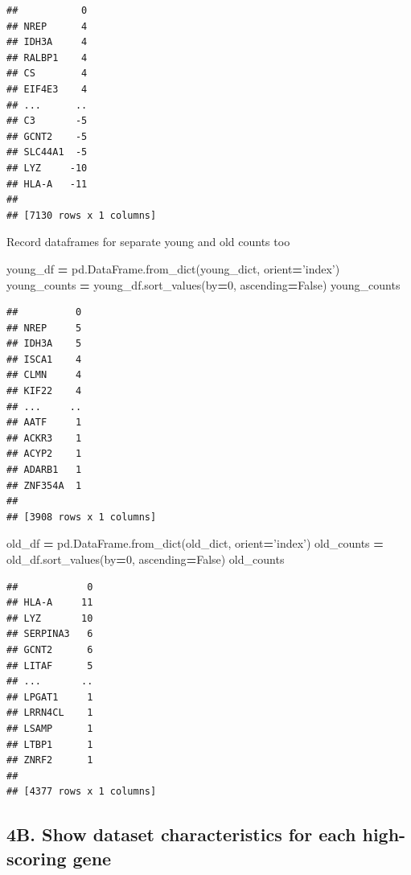 \documentclass[
]{article}
\newenvironment{Shaded}{\begin{snugshade}}{\end{snugshade}}
\newcommand{\DecValTok}[1]{\textcolor[rgb]{0.00,0.00,0.81}{#1}}
\newcommand{\NormalTok}[1]{#1}
\newcommand{\OperatorTok}[1]{\textcolor[rgb]{0.81,0.36,0.00}{\textbf{#1}}}
\newcommand{\StringTok}[1]{\textcolor[rgb]{0.31,0.60,0.02}{#1}}
\newcommand{\VariableTok}[1]{\textcolor[rgb]{0.00,0.00,0.00}{#1}}
\begin{document}
\begin{verbatim}
##           0
## NREP      4
## IDH3A     4
## RALBP1    4
## CS        4
## EIF4E3    4
## ...      ..
## C3       -5
## GCNT2    -5
## SLC44A1  -5
## LYZ     -10
## HLA-A   -11
## 
## [7130 rows x 1 columns]
\end{verbatim}

Record dataframes for separate young and old counts too

\begin{Shaded}
\begin{Highlighting}[]
\NormalTok{young_df }\OperatorTok{=}\NormalTok{ pd.DataFrame.from_dict(young_dict, orient}\OperatorTok{=}\StringTok{'index'}\NormalTok{)}
\NormalTok{young_counts }\OperatorTok{=}\NormalTok{ young_df.sort_values(by}\OperatorTok{=}\DecValTok{0}\NormalTok{, ascending}\OperatorTok{=}\VariableTok{False}\NormalTok{)}
\NormalTok{young_counts}
\end{Highlighting}
\end{Shaded}

\begin{verbatim}
##          0
## NREP     5
## IDH3A    5
## ISCA1    4
## CLMN     4
## KIF22    4
## ...     ..
## AATF     1
## ACKR3    1
## ACYP2    1
## ADARB1   1
## ZNF354A  1
## 
## [3908 rows x 1 columns]
\end{verbatim}

\begin{Shaded}
\begin{Highlighting}[]
\NormalTok{old_df }\OperatorTok{=}\NormalTok{ pd.DataFrame.from_dict(old_dict, orient}\OperatorTok{=}\StringTok{'index'}\NormalTok{)}
\NormalTok{old_counts }\OperatorTok{=}\NormalTok{ old_df.sort_values(by}\OperatorTok{=}\DecValTok{0}\NormalTok{, ascending}\OperatorTok{=}\VariableTok{False}\NormalTok{)}
\NormalTok{old_counts}
\end{Highlighting}
\end{Shaded}

\begin{verbatim}
##            0
## HLA-A     11
## LYZ       10
## SERPINA3   6
## GCNT2      6
## LITAF      5
## ...       ..
## LPGAT1     1
## LRRN4CL    1
## LSAMP      1
## LTBP1      1
## ZNRF2      1
## 
## [4377 rows x 1 columns]
\end{verbatim}

\hypertarget{b.-show-dataset-characteristics-for-each-high-scoring-gene}{%
\subsection{4B. Show dataset characteristics for each high-scoring
gene}\label{b.-show-dataset-characteristics-for-each-high-scoring-gene}}
\end{document}
